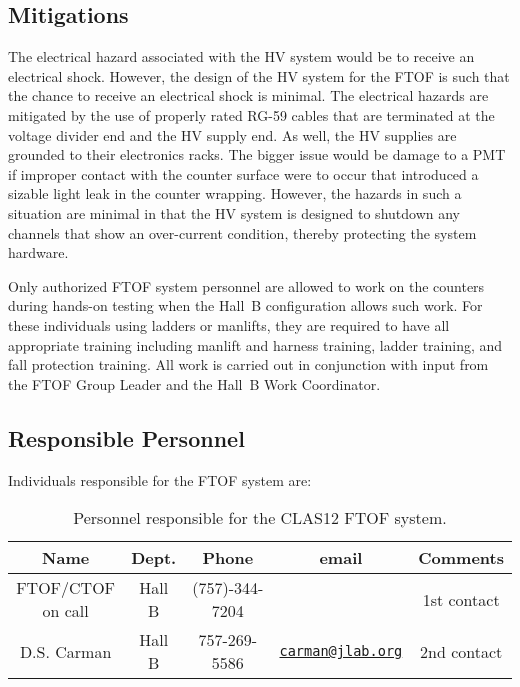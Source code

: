 \subsection{Mitigations}

The electrical hazard associated with the HV system would be to receive an electrical 
shock. However, the design of the HV system for the FTOF is such that the chance to 
receive an electrical shock is minimal. The electrical hazards are mitigated by the use 
of properly rated RG-59 cables that are terminated at the voltage divider end and the HV 
supply end. As well, the HV supplies are grounded to their electronics racks. The bigger 
issue would be damage to a PMT if improper contact with the counter surface were to occur 
that introduced a sizable light leak in the counter wrapping. However, the hazards in such 
a situation are minimal in that the HV system is designed to shutdown any channels that 
show an over-current condition, thereby protecting the system hardware. 

Only authorized FTOF system personnel are allowed to work on the counters during hands-on
testing when the Hall~B configuration allows such work. For these individuals using ladders 
or manlifts, they are required to have all appropriate training including manlift and
harness training, ladder training, and fall protection training. All work is carried out 
in conjunction with input from the FTOF Group Leader and the Hall~B Work Coordinator.

\subsection{Responsible Personnel}

Individuals responsible for the FTOF system are:

\begin{table}[!htb]
\centering
\begin{tabular}{|c|c|c|c|c|} \hline
Name              & Dept.  & Phone          & email & Comments \\ \hline
FTOF/CTOF on call & Hall B & (757)-344-7204 &       & 1st contact \\ \hline
D.S. Carman       & Hall B & 757-269-5586          & \href{mailto:carman@jlab.org}{\nolinkurl{carman@jlab.org}} & 2nd contact \\ \hline
\end{tabular}
\caption{Personnel responsible for the CLAS12 FTOF system.} 
\label{tb:ftof}
\end{table}

